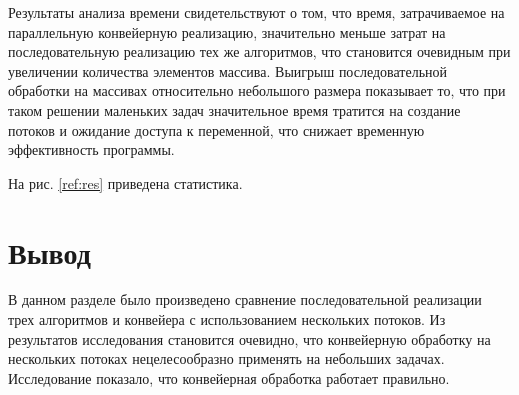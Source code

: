 \documentclass[12pt]{report}
\begin{document}
Результаты анализа времени свидетельствуют о том, что время, затрачиваемое на параллельную конвейерную реализацию, значительно меньше затрат на последовательную реализацию тех же алгоритмов, что становится очевидным при увеличении количества элементов массива. Выигрыш последовательной обработки на массивах относительно небольшого размера показывает то, что при таком решении маленьких задач значительное время тратится на создание потоков и ожидание доступа к переменной, что снижает временную эффективность программы.

На рис. \ref{ref:res} приведена статистика.

\begin{figure}[ht!]
\end{figure}

\section{Вывод}

В данном разделе было произведено сравнение последовательной реализации трех алгоритмов и конвейера с использованием нескольких потоков. Из результатов исследования становится очевидно, что конвейерную обработку на нескольких потоках нецелесообразно применять на небольших задачах. Исследование показало, что конвейерная обработка работает правильно.
\end{document}
